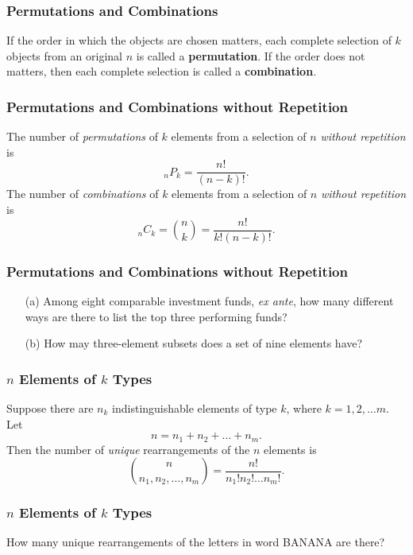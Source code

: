 \documentclass{beamer}
\begin{document}
\begin{frame}
\frametitle{Permutations and Combinations}
\begin{Definition}
If the order in which the objects are chosen matters, each complete selection of $k$ objects from an original $n$ is called a {\bf permutation}. If the order does not matters, then each complete selection is called a {\bf combination}.
\end{Definition} 

\end{frame}

\begin{frame}
\frametitle{Permutations and Combinations without Repetition}

The number of {\it permutations} of $k$ elements from a selection of $n$ {\it without repetition} is 
$$
_n P_k = \frac{n!}{(n - k)!}.
$$
The number of {\it combinations} of $k$ elements from a selection of $n$ {\it without repetition} is 
$$
_nC_k = {n\choose k} =  \frac{n!}{k!(n-k)!}.
$$

\end{frame}

\begin{frame}[t]
\frametitle{Permutations and Combinations without Repetition}
\begin{Example}
\begin{enumerate}
\item[(a)] Among eight comparable investment funds, {\it ex ante}, how many different ways are there to list the top three performing funds?
\item[(b)] How may three-element subsets does a set of nine elements have?
\end{enumerate}
\end{Example}
\end{frame}

\begin{frame}
\frametitle{$n$ Elements of $k$ Types}
Suppose there are $n_k$ indistinguishable elements of type $k$, where $k = 1, 2,\ldots m$. Let
$$
n = n_1 + n_2 + \ldots + n_m.
$$
Then the number of {\it unique} rearrangements of the $n$ elements is
$$
{n \choose n_1, n_2,\ldots, n_m} = \frac{n!}{n_1! n_2!\ldots n_m!}.
$$
\end{frame}

\begin{frame}[t]
\frametitle{$n$ Elements of $k$ Types}
\begin{Example}
How many unique rearrangements of the letters in word BANANA are there?
\end{Example}
\end{frame}
\end{document}
